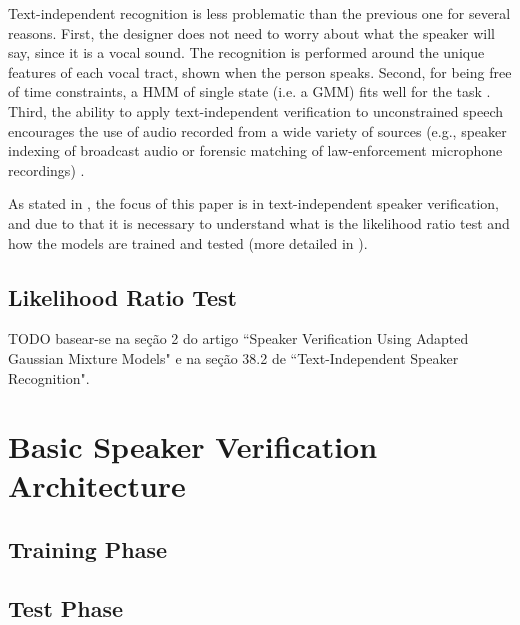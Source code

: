 Text-independent recognition is less problematic than the previous one for several reasons. First, the designer does not need to worry about what the speaker will say, since it is a vocal sound. The recognition is performed around the unique features of each vocal tract, shown when the person speaks. Second, for being free of time constraints, a HMM of single state (i.e. a GMM) fits well for the task \cite{hebert.2008}. Third, the ability to apply text-independent verification to unconstrained speech encourages the use of audio recorded from a wide variety of sources (e.g., speaker indexing of broadcast audio or forensic matching of law-enforcement microphone recordings) \cite{reynolds.campbell.2008}.

As stated in , the focus of this paper is in text-independent speaker verification, and due to that it is necessary to understand what is the likelihood ratio test and how the models are trained and tested (more detailed in ).

\subsection{Likelihood Ratio Test}

TODO basear-se na seção 2 do artigo ``Speaker Verification Using Adapted Gaussian Mixture Models" e na seção 38.2 de ``Text-Independent Speaker Recognition".

\section{Basic Speaker Verification Architecture}

\subsection{Training Phase}

\subsection{Test Phase}